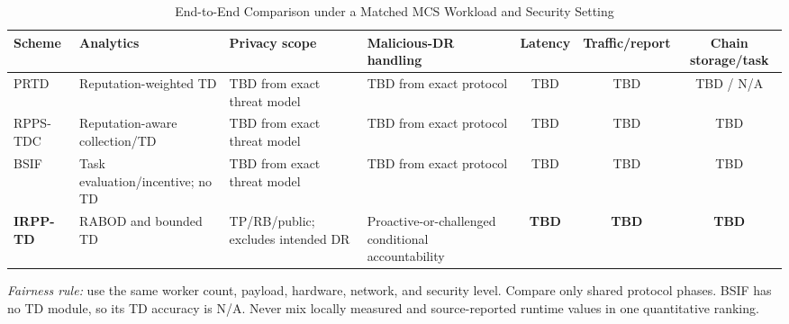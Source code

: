 \documentclass[journal]{IEEEtran}
\newcommand{\tbd}{\textcolor{tbdblue}{\textsf{TBD}}}
\begin{document}
\begin{table}[!t]
\centering
\caption{End-to-End Comparison under a Matched MCS Workload and Security Setting}
\label{tab:e2e-matched-comparison}
\scriptsize
\setlength{\tabcolsep}{1.7pt}
\renewcommand{\arraystretch}{1.04}
\begin{tabularx}{\textwidth}{@{}>{\raggedright\arraybackslash}p{}>{\raggedright\arraybackslash}p{}>{\raggedright\arraybackslash}p{}>{\raggedright\arraybackslash}p{}ccc@{}}
\toprule
\textbf{Scheme} & \textbf{Analytics} & \textbf{Privacy scope} &
\textbf{Malicious-DR handling} & \textbf{Latency} &
\textbf{Traffic/report} & \textbf{Chain storage/task} \\
\midrule
PRTD & Reputation-weighted TD & \tbd{} from exact threat model & \tbd{} from exact protocol & \tbd & \tbd & \tbd{} / N/A \\
RPPS-TDC & Reputation-aware collection/TD & \tbd{} from exact threat model & \tbd{} from exact protocol & \tbd & \tbd & \tbd \\
BSIF & Task evaluation/incentive; no TD & \tbd{} from exact threat model & \tbd{} from exact protocol & \tbd & \tbd & \tbd \\
\textbf{IRPP-TD} & RABOD and bounded TD & TP/RB/public; excludes intended DR & Proactive-or-challenged conditional accountability & \textbf{\tbd} & \textbf{\tbd} & \textbf{\tbd} \\
\bottomrule
\end{tabularx}
\vspace{0.25ex}
\parbox{0.98\textwidth}{\scriptsize
\textit{Fairness rule:} use the same worker count, payload, hardware, network,
and security level. Compare only shared protocol phases. BSIF has no TD module,
so its TD accuracy is N/A. Never mix locally measured and source-reported
runtime values in one quantitative ranking.}
\end{table}
\end{document}
